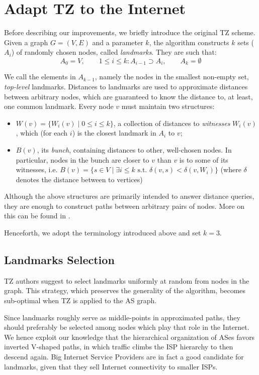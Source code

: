 \documentclass[a4paper,11pt,oneside]{report}
\begin{document}
\chapter{Adapt TZ to the Internet}
\label{chap.adapt-tz-internet}

Before describing our improvements, we briefly introduce the original TZ scheme. Given a graph $G=(V, E)$ and a parameter $k$, the algorithm constructs $k$ sets ($A_i$) of randomly chosen nodes, called \emph{landmarks}. They are such that:
\[
A_0 = V, \qquad 1 \leq i \leq k: A_{i-1} \supset A_i, \qquad A_k = \emptyset
\]

We call the elements in $A_{k-1}$, namely the nodes in the smallest non-empty set, \emph{top-level} landmarks.
Distances to landmarks are used to approximate distances between arbitrary nodes, which are guaranteed to know the distance to, at least, one common landmark. Every node $v$ must maintain two structures:
\begin{itemize}
\item $W(v) = \{W_i(v) \;|\; 0 \leq i \leq k \}$, a collection of distances to \emph{witnesses} $W_i(v)$, which (for each $i$) is the closest landmark in $A_i$ to $v$;
\item $B(v)$, its \emph{bunch}, containing distances to other, well-chosen nodes. In particular, nodes in the bunch are closer to $v$ than $v$ is to some of its witnesses, i.e. $B(v) = \{s \in V \;\vert\; \exists i \leq k \text{ s.t. } \delta(v, s) < \delta(v, W_i)\}$ (where $\delta$ denotes the distance between to vertices)
\end{itemize}

Although the above structures are primarily intended to answer distance queries, they are enough to construct paths between arbitrary pairs of nodes. More on this can be found in \cite{thorupApproximateDistanceOracles2005}.

Henceforth, we adopt the terminology introduced above and set $k=3$.

\section{Landmarks Selection}
\label{sec.landmarks-sel}
TZ authors suggest to select landmarks uniformly at random from nodes in the graph. This strategy, which preserves the generality of the algorithm, becomes sub-optimal when TZ is applied to the AS graph.

Since landmarks roughly serve as middle-points in approximated paths, they should preferably be selected among nodes which play that role in the Internet. We hence exploit our knowledge that the hierarchical organization of ASes favors inverted V-shaped paths, in which traffic climbs the ISP hierarchy to then descend again. Big Internet Service Providers are in fact a good candidate for landmarks, given that they sell Internet connectivity to smaller ISPs.
\end{document}
